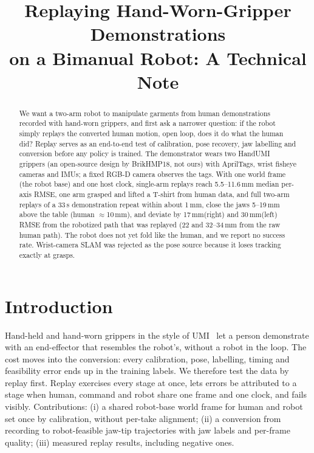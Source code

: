 \documentclass[conference,10pt]{IEEEtran}
\newcommand{\mm}{\,mm\xspace}
\begin{document}
\title{Replaying Hand-Worn-Gripper Demonstrations\\on a Bimanual Robot: A Technical Note}
\author{
}
\maketitle

\begin{abstract}
We want a two-arm robot to manipulate garments from human demonstrations recorded with hand-worn grippers, and first ask
a narrower question: if the robot simply replays the converted human motion, open loop, does it do what the human did?
Replay serves as an end-to-end test of calibration, pose recovery, jaw labelling and conversion before any policy is
trained. The demonstrator wears two HandUMI grippers (an open-source design by BrikHMP18, not ours) with AprilTags, wrist
fisheye cameras and IMUs; a fixed RGB-D camera observes the tags. With one world frame (the robot base) and one host
clock, single-arm replays reach 5.5--11.6\mm median per-axis RMSE, one arm grasped and lifted a T-shirt from human data,
and full two-arm replays of a 33\,s demonstration repeat within about 1\mm, close the jaws 5--19\mm above the table
(human $\approx$10\mm), and deviate by 17\mm (right) and 30\mm (left) RMSE from the robotized path that was replayed (22 and 32--34\mm from the raw human path). The robot does not yet fold
like the human, and we report no success rate. Wrist-camera SLAM was rejected as the pose source because it loses
tracking exactly at grasps.
\end{abstract}

\section{Introduction}
Hand-held and hand-worn grippers in the style of UMI~\cite{chi2024umi} let a person demonstrate with an end-effector that
resembles the robot's, without a robot in the loop. The cost moves into the conversion: every calibration, pose,
labelling, timing and feasibility error ends up in the training labels. We therefore test the data by replay first.
Replay exercises every stage at once, lets errors be attributed to a stage when human, command and robot share one
frame and one clock, and fails visibly. Contributions: (i) a shared robot-base world frame for human and robot set once
by calibration, without per-take alignment; (ii) a conversion from recording to robot-feasible jaw-tip trajectories with
jaw labels and per-frame quality; (iii) measured replay results, including negative ones.
\end{document}
